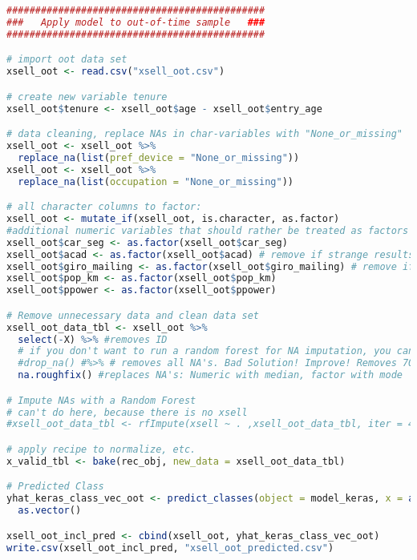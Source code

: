 \begin{lstlisting}[language=R,caption={Using the ANN to predict the previously unseen out-of-time data set}, label=lst_oot]
#############################################
###   Apply model to out-of-time sample   ###
#############################################

# import oot data set
xsell_oot <- read.csv("xsell_oot.csv")

# create new variable tenure
xsell_oot$tenure <- xsell_oot$age - xsell_oot$entry_age

# data cleaning, replace NAs in char-variables with "None_or_missing"
xsell_oot <- xsell_oot %>%
  replace_na(list(pref_device = "None_or_missing"))
xsell_oot <- xsell_oot %>%
  replace_na(list(occupation = "None_or_missing"))

# all character columns to factor:
xsell_oot <- mutate_if(xsell_oot, is.character, as.factor)
#additional numeric variables that should rather be treated as factors
xsell_oot$car_seg <- as.factor(xsell_oot$car_seg)
xsell_oot$acad <- as.factor(xsell_oot$acad) # remove if strange results
xsell_oot$giro_mailing <- as.factor(xsell_oot$giro_mailing) # remove if strange results
xsell_oot$pop_km <- as.factor(xsell_oot$pop_km)
xsell_oot$ppower <- as.factor(xsell_oot$ppower)

# Remove unnecessary data and clean data set
xsell_oot_data_tbl <- xsell_oot %>%
  select(-X) %>% #removes ID
  # if you don't want to run a random forest for NA imputation, you can do apply of the two easier fixes to NA's:
  #drop_na() #%>% # removes all NA's. Bad Solution! Improve! Removes 70% of observations
  na.roughfix() #replaces NA's: Numeric with median, factor with mode

# Impute NAs with a Random Forest
# can't do here, because there is no xsell
#xsell_oot_data_tbl <- rfImpute(xsell ~ . ,xsell_oot_data_tbl, iter = 4, ntree=100) 

# apply recipe to normalize, etc.
x_valid_tbl <- bake(rec_obj, new_data = xsell_oot_data_tbl)

# Predicted Class
yhat_keras_class_vec_oot <- predict_classes(object = model_keras, x = as.matrix(x_valid_tbl)) %>%
  as.vector()

xsell_oot_incl_pred <- cbind(xsell_oot, yhat_keras_class_vec_oot)
write.csv(xsell_oot_incl_pred, "xsell_oot_predicted.csv")

      
\end{lstlisting}